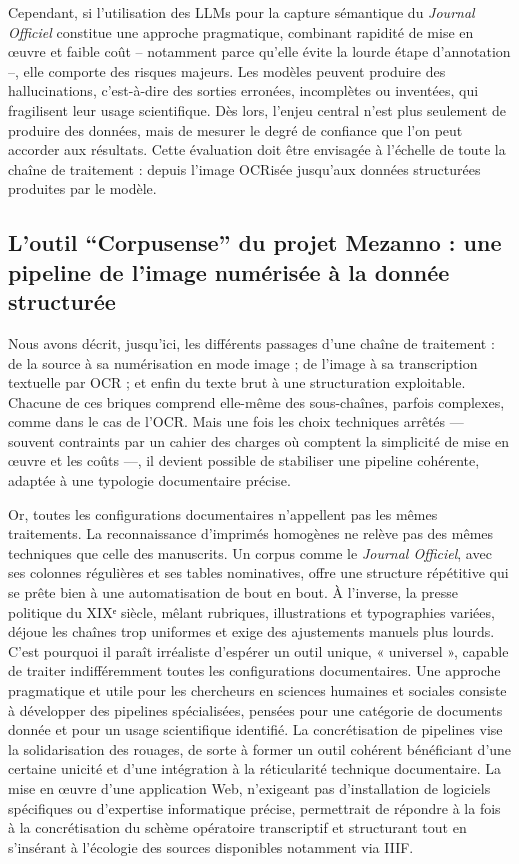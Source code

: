 Cependant, si l’utilisation des LLMs pour la capture sémantique du \emph{Journal Officiel} constitue une approche pragmatique, combinant rapidité de mise en œuvre et faible coût – notamment parce qu’elle évite la lourde étape d’annotation –, elle comporte des risques majeurs. Les modèles peuvent produire des hallucinations, c’est-à-dire des sorties erronées, incomplètes ou inventées, qui fragilisent leur usage scientifique. Dès lors, l’enjeu central n’est plus seulement de produire des données, mais de mesurer le degré de confiance que l’on peut accorder aux résultats. Cette évaluation doit être envisagée à l’échelle de toute la chaîne de traitement : depuis l’image OCRisée jusqu’aux données structurées produites par le modèle.

\subsection{L'outil \enquote{Corpusense} du projet Mezanno : une pipeline de l'image numérisée à la donnée structurée}

Nous avons décrit, jusqu’ici, les différents passages d’une chaîne de traitement : de la source à sa numérisation en mode image ; de l’image à sa transcription textuelle par OCR ; et enfin du texte brut à une structuration exploitable. Chacune de ces briques comprend elle-même des sous-chaînes, parfois complexes, comme dans le cas de l’OCR. Mais une fois les choix techniques arrêtés — souvent contraints par un cahier des charges où comptent la simplicité de mise en œuvre et les coûts —, il devient possible de stabiliser une pipeline cohérente, adaptée à une typologie documentaire précise.

Or, toutes les configurations documentaires n’appellent pas les mêmes traitements. La reconnaissance d’imprimés homogènes ne relève pas des mêmes techniques que celle des manuscrits. Un corpus comme le \emph{Journal Officiel}, avec ses colonnes régulières et ses tables nominatives, offre une structure répétitive qui se prête bien à une automatisation de bout en bout. À l’inverse, la presse politique du XIXᵉ siècle, mêlant rubriques, illustrations et typographies variées, déjoue les chaînes trop uniformes et exige des ajustements manuels plus lourds. C’est pourquoi il paraît irréaliste d’espérer un outil unique, « universel », capable de traiter indifféremment toutes les configurations documentaires. Une approche pragmatique et utile pour les chercheurs en sciences humaines et sociales consiste à développer des pipelines spécialisées, pensées pour une catégorie de documents donnée et pour un usage scientifique identifié. La concrétisation de pipelines vise la solidarisation des rouages, de sorte à former un outil cohérent bénéficiant d'une certaine unicité et d'une intégration à la réticularité technique documentaire. La mise en œuvre d'une application Web, n'exigeant pas d'installation de logiciels spécifiques ou d'expertise informatique précise, permettrait de répondre à la fois à la concrétisation du schème opératoire transcriptif et structurant tout en s'insérant à l'écologie des sources disponibles notamment via IIIF.

